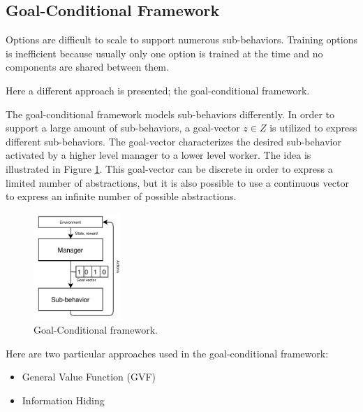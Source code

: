 \subsection{Goal-Conditional Framework}

Options are difficult to scale to support numerous sub-behaviors. Training options is inefficient because usually only
one option is trained at the time and no components are shared between them.

Here a different approach is presented; the goal-conditional framework.

The goal-conditional framework models sub-behaviors differently. In order to support a large amount of sub-behaviors,
a goal-vector $z \in Z$ is utilized to express different sub-behaviors.
The goal-vector characterizes the desired sub-behavior activated by a higher level manager to a lower level worker.
The idea is illustrated in Figure \ref{fig:goal-conditional}. This goal-vector can be discrete in order to express
a limited number of abstractions, but it is also possible to use a continuous vector to express an infinite number of possible abstractions.


\begin{figure}
    \centering
    \includegraphics[width=0.3\textwidth]{Images/goal-conditional.png}
    \caption{Goal-Conditional framework.}
    \label{fig:goal-conditional}
\end{figure}

Here are two particular approaches used in the goal-conditional framework:

\begin{itemize}
    \item General Value Function (GVF)
    \item Information Hiding
\end{itemize}

